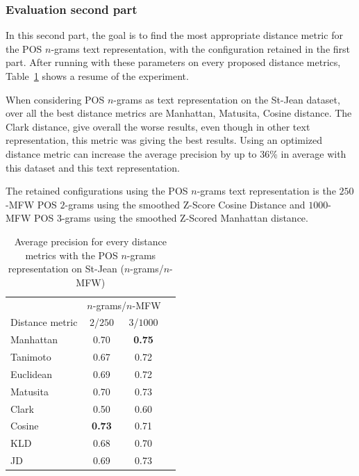 \subsubsection{Evaluation second part}

In this second part, the goal is to find the most appropriate distance metric for the POS $n$-grams text representation, with the configuration retained in the first part.
After running with these parameters on every proposed distance metrics, Table~\ref{tab:pos_ngrams} shows a resume of the experiment.

When considering POS $n$-grams as text representation on the St-Jean dataset, over all the best distance metrics are Manhattan, Matusita, Cosine distance.
The Clark distance, give overall the worse results, even though in other text representation, this metric was giving the best results.
Using an optimized distance metric can increase the average precision by up to $36$\% in average with this dataset and this text representation.

The retained configurations using the POS $n$-grams text representation is the $250$-MFW POS $2$-grams using the smoothed Z-Score Cosine Distance and $1000$-MFW POS $3$-grams using the smoothed Z-Scored Manhattan distance.

\begin{table}
  \centering
  \caption{Average precision for every distance metrics with the POS $n$-grams representation on St-Jean ($n$-grams/$n$-MFW)}
  \label{tab:pos_ngrams}
  \begin{tabular}{l c c c}
    \toprule
                    & \multicolumn{2}{c}{$n$-grams/$n$-MFW} \\
    Distance metric & $2$/$250$ & $3$/$1000$ \\
    \midrule
    Manhattan & 0.70 & \textbf{0.75} \\
    Tanimoto & 0.67 & 0.72 \\
    Euclidean & 0.69 & 0.72 \\
    Matusita & 0.70 & 0.73 \\
    Clark & 0.50 & 0.60 \\
    Cosine & \textbf{0.73} & 0.71 \\
    KLD & 0.68 & 0.70 \\
    JD & 0.69 & 0.73 \\
    \bottomrule
  \end{tabular}
\end{table}
